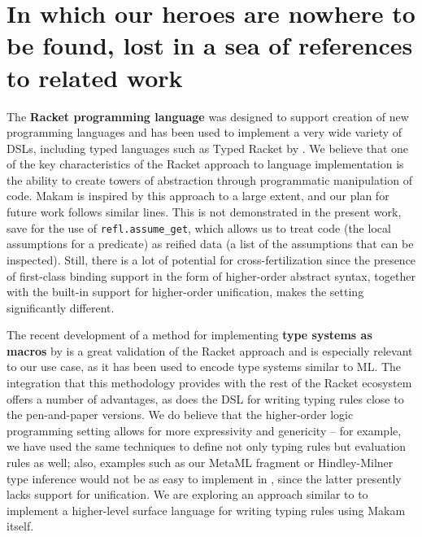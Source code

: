 \section{In which our heroes are nowhere to be found, lost in a sea of
references to related
work}\label{in-which-our-heroes-are-nowhere-to-be-found-lost-in-a-sea-of-references-to-related-work}

\identNormal

The \textbf{Racket programming language} was designed to support
creation of new programming languages \citep{racket-manifesto} and has
been used to implement a very wide variety of DSLs, including typed
languages such as Typed Racket by \citet{typed-racket-main-reference}.
We believe that one of the key characteristics of the Racket approach to
language implementation is the ability to create towers of abstraction
through programmatic manipulation of code. Makam is inspired by this
approach to a large extent, and our plan for future work follows similar
lines. This is not demonstrated in the present work, save for the use of
\texttt{refl.assume\_get}, which allows us to treat code (the local
assumptions for a predicate) as reified data (a list of the assumptions
that can be inspected). Still, there is a lot of potential for
cross-fertilization since the presence of first-class binding support in
the form of higher-order abstract syntax, together with the built-in
support for higher-order unification, makes the \lamprolog
setting significantly different.

The recent development of a method for implementing \textbf{type systems
as macros} by \citet{racket-type-systems-as-macros} is a great
validation of the Racket approach and is especially relevant to our use
case, as it has been used to encode type systems similar to ML. The
integration that this methodology provides with the rest of the Racket
ecosystem offers a number of advantages, as does the
 DSL for writing typing rules close to the
pen-and-paper versions. We do believe that the higher-order logic
programming setting allows for more expressivity and genericity -- for
example, we have used the same techniques to define not only typing
rules but evaluation rules as well; also, examples such as our MetaML
fragment or Hindley-Milner type inference would not be as easy to
implement in , since the latter presently lacks
support for unification. We are exploring an approach similar to
 to implement a higher-level surface language for
writing typing rules using Makam itself.

